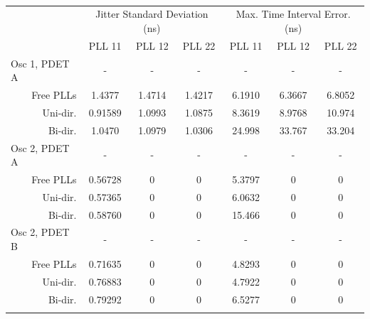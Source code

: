 \documentclass[conference]{IEEEtran}
\newcommand\T{\rule{0pt}{2.6ex}}       %
\newcommand\B{\rule[-1.2ex]{0pt}{0pt}} %
\begin{document}
\begin{table}[!ht]
    \begin{center}
        \begin{tiny}
        	\setlength{\tabcolsep}{.9\tabcolsep}
            \begin{tabular}{cc|c|c|c|c|c|c|}           
                \cline{3-8}
                && \multicolumn{3}{c|}{Jitter Standard Deviation (ns)} & \multicolumn{3}{c|}{Max. Time Interval Error. (ns)} \T\\
                \cline{3-8} 
                &&PLL 11&PLL 12&PLL 22&PLL 11&PLL 12&PLL 22\T\\
                \hline
                \multicolumn{2}{|l|}{Osc 1, PDET A}&-&-&-&-&-&-\T\\
                \multicolumn{2}{|r|}{Free PLLs} &1.4377 &1.4714&1.4217  &6.1910&6.3667&6.8052 \T\\
                \multicolumn{2}{|r|}{Uni-dir.}  &0.91589&1.0993&1.0875  &8.3619&8.9768&10.974 \T\\
                \multicolumn{2}{|r|}{Bi-dir.}   &1.0470 &1.0979&1.0306  &24.998&33.767&33.204 \T\\
                \hline
                \multicolumn{2}{|l|}{Osc 2, PDET A}&-&-&-&-&-&-\T\\
                \multicolumn{2}{|r|}{Free PLLs} &0.56728&0& 0&5.3797&0&0 \T\\
                \multicolumn{2}{|r|}{Uni-dir.}  &0.57365&0& 0&6.0632&0&0 \T\\
                \multicolumn{2}{|r|}{Bi-dir.}   &0.58760&0& 0&15.466&0&0 \T\\
                \hline
                \multicolumn{2}{|l|}{Osc 2, PDET B}&-&-&-&-&-&-\T\\
                \multicolumn{2}{|r|}{Free PLLs} &0.71635&0&0  &4.8293&0&0 \T\\
                \multicolumn{2}{|r|}{Uni-dir.}  &0.76883&0&0  &4.7922&0&0 \T\\
                \multicolumn{2}{|r|}{Bi-dir.}   &0.79292&0&0  &6.5277&0&0 \T\\
                \hline
                \B
                
                
            \end{tabular}
        \end{tiny}
        \caption{}
        \label{table:b_c_perf}
    \end{center}
\vspace{-0.5cm}
\end{table}
\end{document}
